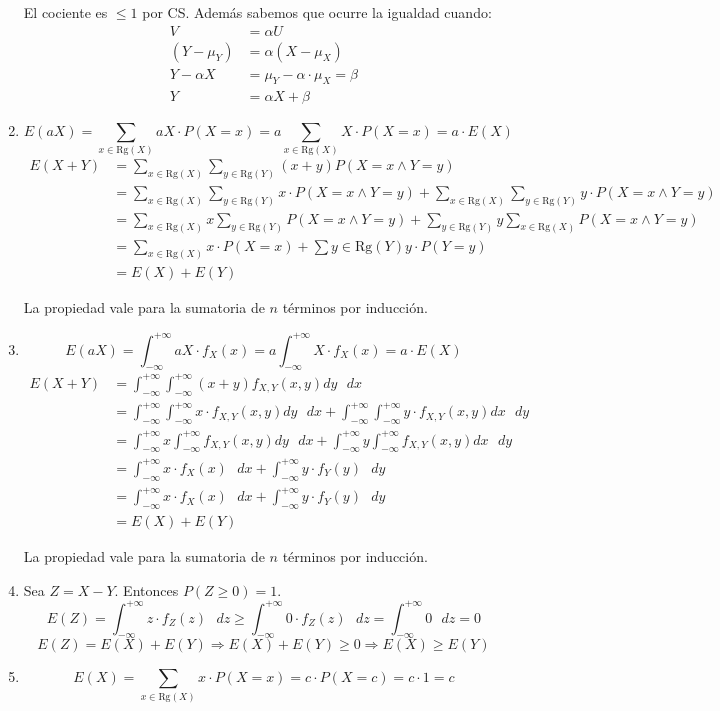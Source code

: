 \begin{enumerate}
		El cociente es $\leq 1$ por CS. Además sabemos que ocurre la igualdad cuando:
			\begin{align*}
				V			& = \alpha U							\\
				(Y-\mu_Y)	& = \alpha (X-\mu_X)					\\
				Y-\alpha X	& = \mu_Y - \alpha\cdot \mu_X = \beta	\\
				Y			& = \alpha X + \beta
			\end{align*}
			
	\item
		$$E(aX) = \sum_{x\in \text{Rg}(X)} aX\cdot P(X=x) = a\sum_{x\in \text{Rg}(X)} X\cdot P(X=x) = a\cdot E(X)$$
		\begin{align*}
			E(X+Y)	& = \sum_{x\in \text{Rg}(X)}\sum_{y\in \text{Rg}(Y)}(x+y)P(X=x \land Y=y)	\\
					& = \sum_{x\in \text{Rg}(X)}\sum_{y\in \text{Rg}(Y)}x\cdot P(X=x \land Y=y) + \sum_{x\in \text{Rg}(X)}\sum_{y\in \text{Rg}(Y)}y\cdot P(X=x \land Y=y)	\\
					& = \sum_{x\in \text{Rg}(X)}x\sum_{y\in \text{Rg}(Y)} P(X=x \land Y=y) + \sum_{y\in \text{Rg}(Y)}y \sum_{x\in \text{Rg}(X)} P(X=x \land Y=y)	\\
					& = \sum_{x\in \text{Rg}(X)}x\cdot P(X=x) + \sum{y\in \text{Rg}(Y)}y \cdot P(Y=y)	\\
					& = E(X) + E(Y)
		\end{align*}
		
		La propiedad vale para la sumatoria de $n$ términos por inducción.
	\item
		$$E(aX) = \int_{-\infty}^{+\infty} aX\cdot f_X(x) = a\int_{-\infty}^{+\infty} X\cdot f_X(x) = a\cdot E(X)$$
		\begin{align*}
			E(X+Y)	& = \int_{-\infty}^{+\infty}\int_{-\infty}^{+\infty}(x+y)f_{X,Y}(x,y)dy\text{ }dx	\\
					& = \int_{-\infty}^{+\infty}\int_{-\infty}^{+\infty}x\cdot f_{X,Y}(x,y)dy\text{ }dx + \int_{-\infty}^{+\infty}\int_{-\infty}^{+\infty}y\cdot f_{X,Y}(x,y)dx\text{ }dy	\\
					& = \int_{-\infty}^{+\infty}x\int_{-\infty}^{+\infty} f_{X,Y}(x,y)dy\text{ }dx + \int_{-\infty}^{+\infty}y\int_{-\infty}^{+\infty} f_{X,Y}(x,y)dx\text{ }dy				\\
					& = \int_{-\infty}^{+\infty}x\cdot f_X(x)\text{ }dx + \int_{-\infty}^{+\infty}y\cdot f_Y(y)\text{ }dy	\\
					& = \int_{-\infty}^{+\infty}x\cdot f_X(x)\text{ }dx + \int_{-\infty}^{+\infty}y\cdot f_Y(y)\text{ }dy	\\
					& = E(X) + E(Y)
		\end{align*}
		
		La propiedad vale para la sumatoria de $n$ términos por inducción.
	\item
		Sea $Z = X-Y$. Entonces $P(Z \geq 0) = 1$.
		$$E(Z) = \int_{-\infty}^{+\infty}z\cdot f_Z(z)\text{ }dz \geq \int_{-\infty}^{+\infty}0\cdot f_Z(z)\text{ }dz = \int_{-\infty}^{+\infty}0 \text{ }dz = 0$$
		$$E(Z) = E(X)+E(Y) \Rightarrow E(X)+E(Y) \geq 0 \Rightarrow E(X) \geq E(Y)$$
	\item
		$$E(X) = \sum_{x \in \text{Rg}(X)} x\cdot P(X=x) = c\cdot P(X=c) = c\cdot 1 = c$$
\end{enumerate}
